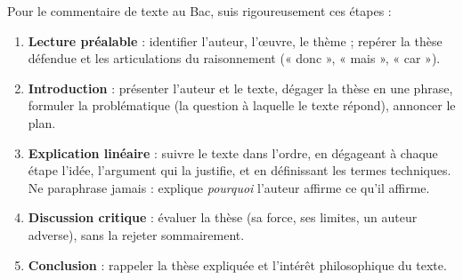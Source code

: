 \documentclass[11pt]{article}
\begin{document}
\begin{methode}
Pour le commentaire de texte au Bac, suis rigoureusement ces étapes :
\begin{enumerate}
\item \textbf{Lecture préalable} : identifier l'auteur, l'œuvre, le thème ; repérer la thèse défendue et les articulations du raisonnement (« donc », « mais », « car »).
\item \textbf{Introduction} : présenter l'auteur et le texte, dégager la thèse en une phrase, formuler la problématique (la question à laquelle le texte répond), annoncer le plan.
\item \textbf{Explication linéaire} : suivre le texte dans l'ordre, en dégageant à chaque étape l'idée, l'argument qui la justifie, et en définissant les termes techniques. Ne paraphrase jamais : explique \emph{pourquoi} l'auteur affirme ce qu'il affirme.
\item \textbf{Discussion critique} : évaluer la thèse (sa force, ses limites, un auteur adverse), sans la rejeter sommairement.
\item \textbf{Conclusion} : rappeler la thèse expliquée et l'intérêt philosophique du texte.
\end{enumerate}
\end{methode}
\end{document}

